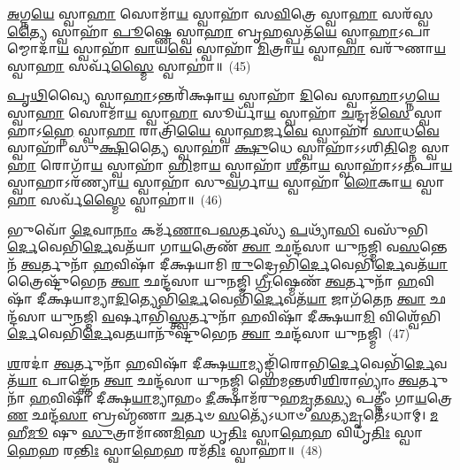 {\anuvakamend[{}]}

\-\ul{𑌅}\-𑌗𑍍𑌨\-\ul{𑌯𑍇} 𑌸𑍍𑌵𑌾\-\ul{𑌹𑌾} 𑌸𑍋𑌮𑌾᳴\-\ul{𑌯} 𑌸𑍍𑌵𑌾𑌹𑌾᳴ 𑌸\-\ul{𑌵𑌿}\-𑌤𑍍𑌰𑍇 𑌸𑍍𑌵𑌾\-\ul{𑌹𑌾} 𑌸𑌰᳴𑌸𑍍𑌵\-\ul{𑌤𑍍𑌯𑍈} 𑌸𑍍𑌵𑌾𑌹𑌾᳴ \ul{𑌪𑍂}\-𑌷𑍍𑌣𑍇 𑌸𑍍𑌵𑌾\-\ul{𑌹𑌾} 𑌬𑍃\-\ul{𑌹}\-𑌸𑍍𑌪𑌤᳴\-\ul{𑌯𑍇} 𑌸𑍍𑌵𑌾\-\ul{𑌹𑌾}\-\-𑌽𑌪𑌾𑌮𑍍𑌮𑍋𑌦𑌾᳴\-\ul{𑌯} 𑌸𑍍𑌵𑌾𑌹𑌾᳴ \ul{𑌵𑌾}\-𑌯\-\ul{𑌵𑍇} 𑌸𑍍𑌵𑌾𑌹𑌾᳴ \ul{𑌮𑌿}\-𑌤𑍍𑌰𑌾\-\ul{𑌯} 𑌸𑍍𑌵𑌾\-\ul{𑌹𑌾} 𑌵𑌰𑍁᳴𑌣𑌾\-\ul{𑌯} 𑌸𑍍𑌵𑌾\-\ul{𑌹𑌾} 𑌸𑌰𑍍𑌵᳴\-\ul{𑌸𑍍𑌮𑍈} 𑌸𑍍𑌵𑌾𑌹𑌾॑॥~(45)

{\anuvakamend[{}]}

\-\ul{𑌪𑍃}\-\-\ul{𑌥𑌿}\-𑌵𑍍𑌯𑍈 𑌸𑍍𑌵𑌾\-\ul{𑌹𑌾}\-\-𑌽𑌨𑍍𑌤𑌰𑌿᳴𑌕𑍍𑌷𑌾\-\ul{𑌯} 𑌸𑍍𑌵𑌾𑌹𑌾᳴ \ul{𑌦𑌿}\-𑌵𑍇 𑌸𑍍𑌵𑌾\-\ul{𑌹𑌾}\-\-𑌽𑌗𑍍𑌨\-\ul{𑌯𑍇} 𑌸𑍍𑌵𑌾\-\ul{𑌹𑌾} 𑌸𑍋𑌮𑌾᳴\-\ul{𑌯} 𑌸𑍍𑌵𑌾\-\ul{𑌹𑌾} 𑌸𑍂𑌰𑍍𑌯𑌾᳴\-\ul{𑌯} 𑌸𑍍𑌵𑌾𑌹𑌾᳴ \ul{𑌚}\-𑌨𑍍𑌦𑍍𑌰𑌮᳴\-\ul{𑌸𑍇} 𑌸𑍍𑌵𑌾𑌹𑌾\-𑌽\-\ul{𑌹𑍍𑌨𑍇} 𑌸𑍍𑌵𑌾\-\ul{𑌹𑌾} 𑌰𑌾𑌤𑍍𑌰𑌿᳴\-\ul{𑌯𑍈} 𑌸𑍍𑌵𑌾\-\ul{𑌹}\-𑌰𑍍𑌜\-\ul{𑌵𑍇} 𑌸𑍍𑌵𑌾𑌹𑌾᳴ \ul{𑌸𑌾}\-𑌧\-\ul{𑌵𑍇} 𑌸𑍍𑌵𑌾𑌹𑌾᳴ 𑌸𑍁\-\ul{𑌕𑍍𑌷𑌿}\-𑌤𑍍𑌯𑍈 𑌸𑍍𑌵𑌾𑌹𑌾॑ \ul{𑌕𑍍𑌷𑍁}\-𑌧𑍇 𑌸𑍍𑌵𑌾𑌹𑌾᳴\-𑌽\-𑌽𑌶𑌿\-\ul{𑌤𑌿}\-𑌮𑍍𑌨𑍇 𑌸𑍍𑌵𑌾\-\ul{𑌹𑌾} 𑌰𑍋𑌗𑌾᳴\-\ul{𑌯} 𑌸𑍍𑌵𑌾𑌹𑌾᳴ \ul{𑌹𑌿}\-𑌮𑌾\-\ul{𑌯} 𑌸𑍍𑌵𑌾𑌹𑌾᳴ \ul{𑌶𑍀}\-𑌤𑌾\-\ul{𑌯} 𑌸𑍍𑌵𑌾𑌹𑌾᳴\-𑌽\-𑌽\-\ul{𑌤}\-𑌪𑌾\-\ul{𑌯} 𑌸𑍍𑌵𑌾𑌹𑌾\-𑌽𑌰᳴𑌣𑍍𑌯𑌾\-\ul{𑌯} 𑌸𑍍𑌵𑌾𑌹𑌾᳴ 𑌸𑍁\-\ul{𑌵}\-𑌰𑍍𑌗𑌾\-\ul{𑌯} 𑌸𑍍𑌵𑌾𑌹𑌾᳴ \ul{𑌲𑍋}\-𑌕𑌾\-\ul{𑌯} 𑌸𑍍𑌵𑌾\-\ul{𑌹𑌾} 𑌸𑌰𑍍𑌵᳴\-\ul{𑌸𑍍𑌮𑍈} 𑌸𑍍𑌵𑌾𑌹𑌾॑॥~(46)

{\anuvakamend[{}]}

𑌭𑍁𑌵𑍋᳴ \ul{𑌦𑍇}\-𑌵𑌾\-\ul{𑌨𑌾𑌂} 𑌕𑌰𑍍𑌮᳴\-\ul{𑌣𑌾}\-𑌪\-\ul{𑌸}\-𑌰𑍍𑌤𑌸𑍍𑌯᳴ \ul{𑌪}\-𑌥𑍍𑌯𑌾᳴\-\ul{𑌸𑌿} 𑌵𑌸𑍁᳴𑌭𑌿\-\ul{𑌰𑍍𑌦𑍇}\-𑌵𑍇𑌭𑌿᳴\-\ul{𑌰𑍍𑌦𑍇}\-𑌵𑌤᳴𑌯𑌾 𑌗𑌾\-\ul{𑌯}\-𑌤𑍍𑌰𑍇𑌣᳴ \ul{𑌤𑍍𑌵𑌾} 𑌛𑌨𑍍𑌦᳴𑌸𑌾 𑌯𑍁𑌨𑌜𑍍𑌮𑌿 𑌵\-\ul{𑌸}\-𑌨𑍍𑌤𑍇𑌨᳴ \ul{𑌤𑍍𑌵}\-𑌰𑍍𑌤𑍁𑌨𑌾᳴ \ul{𑌹}\-𑌵𑌿𑌷𑌾᳴ 𑌦𑍀𑌕𑍍𑌷𑌯𑌾𑌮𑌿 \ul{𑌰𑍁}\-𑌦𑍍𑌰𑍇𑌭𑌿᳴\-\ul{𑌰𑍍𑌦𑍇}\-𑌵𑍇𑌭𑌿᳴\-\ul{𑌰𑍍𑌦𑍇}\-𑌵𑌤᳴\-\ul{𑌯𑌾} 𑌤𑍍𑌰𑍈𑌷𑍍𑌟𑍁᳴𑌭𑍇𑌨 \ul{𑌤𑍍𑌵𑌾} 𑌛𑌨𑍍𑌦᳴𑌸𑌾 𑌯𑍁𑌨𑌜𑍍𑌮𑌿 \ul{𑌗𑍍𑌰𑍀}\-𑌷𑍍𑌮𑍇𑌣᳴ \ul{𑌤𑍍𑌵}\-𑌰𑍍𑌤𑍁𑌨𑌾᳴ \ul{𑌹}\-𑌵𑌿𑌷𑌾᳴ 𑌦𑍀𑌕𑍍𑌷𑌯𑌾𑌮𑍍𑌯𑌾\-\ul{𑌦𑌿}\-𑌤𑍍𑌯𑍇𑌭𑌿᳴\-\-\ul{𑌰𑍍𑌦𑍇}\-𑌵𑍇𑌭𑌿᳴\-\ul{𑌰𑍍𑌦𑍇}\-𑌵𑌤᳴\-\ul{𑌯𑌾} 𑌜𑌾𑌗᳴𑌤𑍇𑌨 \ul{𑌤𑍍𑌵𑌾} 𑌛𑌨𑍍𑌦᳴𑌸𑌾 𑌯𑍁𑌨𑌜𑍍𑌮𑌿 \ul{𑌵}\-𑌰𑍍\mbox{}𑌷𑌾𑌭𑌿᳴\-\ul{𑌸𑍍𑌤𑍍𑌵}\-𑌰𑍍𑌤𑍁𑌨𑌾᳴ \ul{𑌹}\-𑌵𑌿𑌷𑌾᳴ 𑌦𑍀𑌕𑍍𑌷𑌯𑌾\-\ul{𑌮𑌿} 𑌵𑌿𑌶𑍍𑌵𑍇᳴𑌭𑌿\-\ul{𑌰𑍍𑌦𑍇}\-𑌵𑍇𑌭𑌿᳴\-\ul{𑌰𑍍𑌦𑍇}\-𑌵\-\ul{𑌤}\-𑌯𑌾𑌨𑍁᳴𑌷𑍍𑌟𑍁𑌭𑍇𑌨 \ul{𑌤𑍍𑌵𑌾} 𑌛𑌨𑍍𑌦᳴𑌸𑌾 𑌯𑍁𑌨𑌜𑍍𑌮𑌿~(47)

\-\ul{𑌶}\-𑌰𑌦𑌾॑ \ul{𑌤𑍍𑌵}\-𑌰𑍍𑌤𑍁𑌨𑌾᳴ \ul{𑌹}\-𑌵𑌿𑌷𑌾᳴ 𑌦𑍀𑌕𑍍𑌷\-\ul{𑌯𑌾}\-𑌮𑍍𑌯𑌙𑍍𑌗𑌿᳴𑌰𑍋𑌭𑌿\-\ul{𑌰𑍍𑌦𑍇}\-𑌵𑍇𑌭𑌿᳴\-\ul{𑌰𑍍𑌦𑍇}\-𑌵𑌤᳴\-\ul{𑌯𑌾} 𑌪𑌾𑌙𑍍𑌕𑍍𑌤𑍇᳴𑌨 \ul{𑌤𑍍𑌵𑌾} 𑌛𑌨𑍍𑌦᳴𑌸𑌾 𑌯𑍁𑌨𑌜𑍍𑌮𑌿 𑌹𑍇𑌮𑌨𑍍𑌤𑌶𑌿\-\ul{𑌶𑌿}\-𑌰𑌾\-𑌭𑍍𑌯𑌾𑌂॑ \ul{𑌤𑍍𑌵}\-𑌰𑍍𑌤𑍁𑌨𑌾᳴ \ul{𑌹}\-𑌵𑌿𑌷𑌾᳴ 𑌦𑍀𑌕𑍍𑌷\-\ul{𑌯𑌾}\-𑌮𑍍𑌯𑌾𑌹𑌂 \ul{𑌦𑍀}\-𑌕𑍍𑌷𑌾𑌮᳴𑌰𑍁𑌹\-\ul{𑌮𑍃}\-𑌤\-\ul{𑌸𑍍𑌯} 𑌪𑌤𑍍𑌨𑍀𑌂॑ 𑌗𑌾\-\ul{𑌯}\-𑌤𑍍𑌰𑍇\-\ul{𑌣} 𑌛𑌨𑍍𑌦᳴\-\ul{𑌸𑌾} 𑌬𑍍𑌰𑌹𑍍𑌮᳴𑌣𑌾 \ul{𑌚}\-𑌰𑍍𑌤𑍞 \ul{𑌸}\-𑌤𑍍𑌯𑍇᳴\-𑌽𑌧𑌾𑍞 \ul{𑌸}\-𑌤𑍍𑌯\-\ul{𑌮𑍃}\-𑌤𑍇᳴\-𑌽𑌧𑌾𑌮𑍍। \ul{𑌮}\-𑌹𑍀\-\ul{𑌮𑍂} 𑌷𑍁 \ul{𑌸𑍁}\-𑌤𑍍𑌰𑌾𑌮𑌾᳴𑌣\-\ul{𑌮𑌿}\-𑌹 𑌧𑍃\-\ul{𑌤𑌿𑌃} 𑌸𑍍𑌵𑌾\-\ul{𑌹𑍇}\-𑌹 𑌵𑌿𑌧𑍃᳴\-\ul{𑌤𑌿𑌃} 𑌸𑍍𑌵𑌾\-\ul{𑌹𑍇}\-𑌹 𑌰\-\ul{𑌨𑍍𑌤𑌿𑌃} 𑌸𑍍𑌵𑌾\-\ul{𑌹𑍇}\-𑌹 𑌰𑌮᳴\-\ul{𑌤𑌿𑌃} 𑌸𑍍𑌵𑌾𑌹𑌾॑॥~(48)

